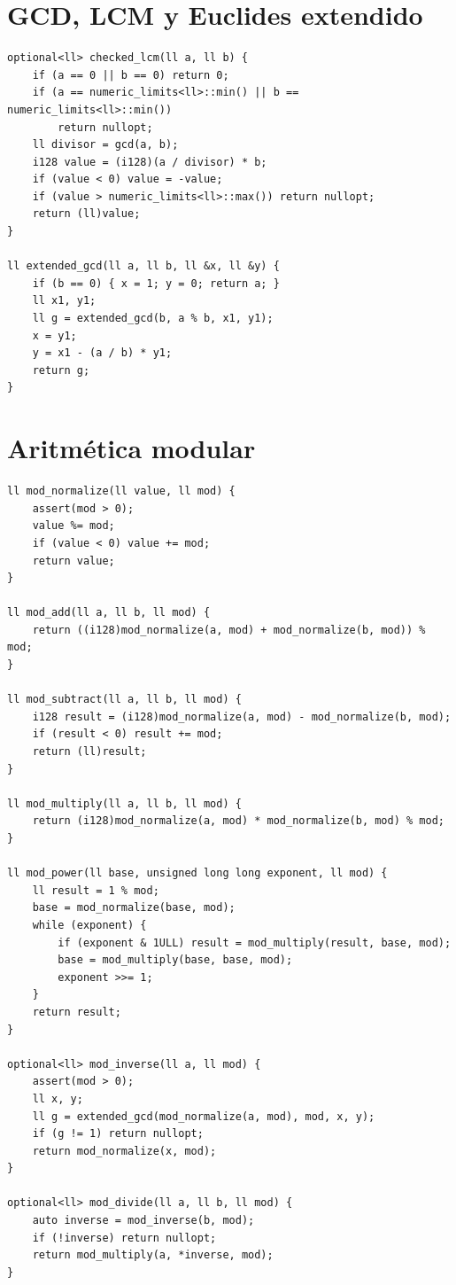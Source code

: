 \section{GCD, LCM y Euclides extendido}

\begin{lstlisting}[style=cpp]
optional<ll> checked_lcm(ll a, ll b) {
    if (a == 0 || b == 0) return 0;
    if (a == numeric_limits<ll>::min() || b == numeric_limits<ll>::min())
        return nullopt;
    ll divisor = gcd(a, b);
    i128 value = (i128)(a / divisor) * b;
    if (value < 0) value = -value;
    if (value > numeric_limits<ll>::max()) return nullopt;
    return (ll)value;
}

ll extended_gcd(ll a, ll b, ll &x, ll &y) {
    if (b == 0) { x = 1; y = 0; return a; }
    ll x1, y1;
    ll g = extended_gcd(b, a % b, x1, y1);
    x = y1;
    y = x1 - (a / b) * y1;
    return g;
}
\end{lstlisting}

\section{Aritm\'etica modular}

\begin{lstlisting}[style=cpp]
ll mod_normalize(ll value, ll mod) {
    assert(mod > 0);
    value %= mod;
    if (value < 0) value += mod;
    return value;
}

ll mod_add(ll a, ll b, ll mod) {
    return ((i128)mod_normalize(a, mod) + mod_normalize(b, mod)) % mod;
}

ll mod_subtract(ll a, ll b, ll mod) {
    i128 result = (i128)mod_normalize(a, mod) - mod_normalize(b, mod);
    if (result < 0) result += mod;
    return (ll)result;
}

ll mod_multiply(ll a, ll b, ll mod) {
    return (i128)mod_normalize(a, mod) * mod_normalize(b, mod) % mod;
}

ll mod_power(ll base, unsigned long long exponent, ll mod) {
    ll result = 1 % mod;
    base = mod_normalize(base, mod);
    while (exponent) {
        if (exponent & 1ULL) result = mod_multiply(result, base, mod);
        base = mod_multiply(base, base, mod);
        exponent >>= 1;
    }
    return result;
}

optional<ll> mod_inverse(ll a, ll mod) {
    assert(mod > 0);
    ll x, y;
    ll g = extended_gcd(mod_normalize(a, mod), mod, x, y);
    if (g != 1) return nullopt;
    return mod_normalize(x, mod);
}

optional<ll> mod_divide(ll a, ll b, ll mod) {
    auto inverse = mod_inverse(b, mod);
    if (!inverse) return nullopt;
    return mod_multiply(a, *inverse, mod);
}
\end{lstlisting}

